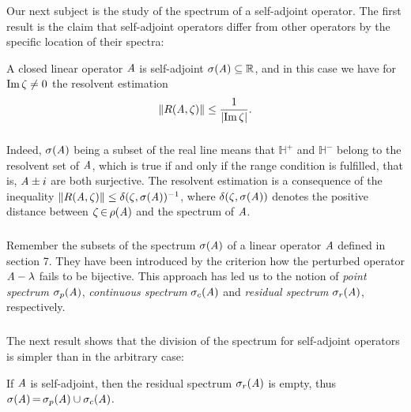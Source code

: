 \documentclass[11pt,twoside]{article}
\begin{document}
\subsubsection*{} %
Our next subject is the study of the spectrum of a self-adjoint operator.
The first result is the claim
that self-adjoint operators differ from other operators
by the specific location of their spectra:

\begin{theorem}\label{CRITERION_FOR_SELF-ADJOINTNESS}
A closed linear operator $\mathit{A}$ is self-adjoint \iff
$\sigma(\mathit{A}) \subseteq {\mathbb{R}}$,
and in this case we have for $\operatorname{Im} \zeta \neq 0$ the resolvent estimation
\[
\norm{R(\linA,\zeta)} \leq \frac{1}{\abs{\im \zeta} }.
\]
\end{theorem}

\subparagraph*{}
Indeed,
$\sigma(\mathit{A})$ being a subset of the real line means that
$\mathbb{H}^+$ and $\mathbb{H}^-$ belong to the resolvent set of $\mathit{A}$,
which is true if and only if the range condition is fulfilled,
that is, 
$\mathit{A} \pm i$ are both surjective.
The resolvent estimation is a consequence of the inequality
$\left\lVert R(\mathit{A},\zeta) \right\rVert \leq \delta(\zeta,\sigma(\mathit{A}))^{-1}$,
where $\delta(\zeta,\sigma(\mathit{A}))$ denotes the positive distance between 
$\zeta {\,\in\,} \rho(\mathit{A})$ and the spectrum of $\mathit{A}$.

\subsubsection*{} %
Remember the subsets of the spectrum $\sigma(\mathit{A})$
of a linear operator $\mathit{A}$ defined in section 7.
They have been introduced by the criterion
how the perturbed operator $\mathit{A} - \lambda$ fails to be bijective.
This approach has led us to the notion of
\textit{point spectrum} $\sigma_p(\mathit{A})$,
\textit{continuous spectrum} $\sigma_c(\mathit{A})$ and
\textit{residual spectrum} $\sigma_r(\mathit{A})$,
respectively.

\subparagraph*{}
The next result shows
that the division of the spectrum for self-adjoint operators
is simpler than in the arbitrary case:

\begin{theorem}\label{RESIDUAL_SPECTRUM_OF_SELF-ADJOINT_OPERATOR_IS_EMPTY}
If $\mathit{A}$ is self-adjoint,
then the residual spectrum $\sigma_r(\mathit{A})$ is empty,
thus $\sigma(\mathit{A}) {\,=\,} \sigma_p(\mathit{A}) \cup \sigma_c(\mathit{A})$.
\end{theorem}
\end{document}
